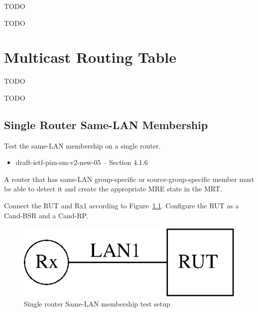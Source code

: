 \documentclass[11pt]{report}
\begin{document}
TODO

TODO

\chapter{Multicast Routing Table}

TODO

TODO

\newpage
\section{Single Router Same-LAN Membership}

Test the same-LAN membership on a single router.

\begin{itemize}
  \item draft-ietf-pim-sm-v2-new-05 -- Section 4.1.6
\end{itemize}

A router that has same-LAN group-specific or
source-group-specific member must be able to detect it and create the
appropriate MRE state in the MRT.

Connect the RUT and Rx1 according to
Figure~\ref{fig:single_router_same_lan_membership}.
Configure the RUT as a Cand-BSR and a Cand-RP.

\begin{figure}[htbp]
  \begin{center}
    \includegraphics[scale=0.8]{figs/pim_test_7_1_single_router_samelan_membership}
    \caption{Single router Same-LAN membership test setup}
    \label{fig:single_router_same_lan_membership}
  \end{center}
\end{figure}

\end{document}
